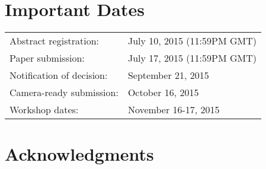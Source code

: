 \documentclass{hotnets15}
\begin{document}
\section{Important Dates}

{
\small
\begin{tabular}{ll}
Abstract registration: 	        & July 10, 2015 (11:59PM GMT) \\
Paper submission: 	        & July 17, 2015 (11:59PM GMT) \\
Notification of decision: 	& September 21, 2015 \\
Camera-ready submission: 	& October 16, 2015 \\
Workshop dates: 	        & November 16-17, 2015 \\
\end{tabular}
}

\section*{Acknowledgments}

 
\begin{small}

\end{small}
\label{last-page}
\end{document}
